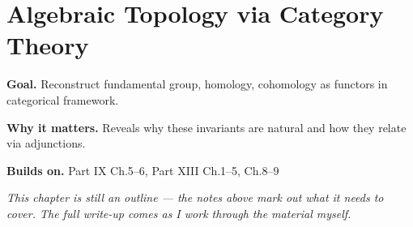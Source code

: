 \chapter{Algebraic Topology via Category Theory}
\label{ch:13-category-theory-and-universal-structures-11}

\begin{chapterintro}
\textbf{Goal.} Reconstruct fundamental group, homology, cohomology as functors in categorical framework.

\textbf{Why it matters.} Reveals why these invariants are natural and how they relate via adjunctions.

\textbf{Builds on.} Part IX Ch.5–6, Part XIII Ch.1–5, Ch.8–9
\end{chapterintro}

\textit{This chapter is still an outline --- the notes above mark out what it needs to cover. The full write-up comes as I work through the material myself.}
